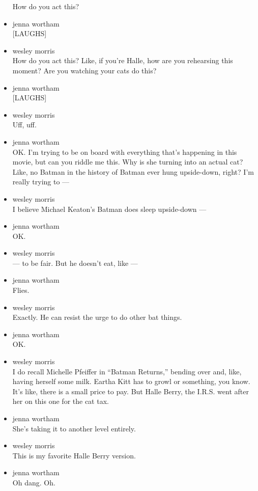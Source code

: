 \begin{itemize}
  How do you act this?
\item
  jenna wortham\\
  {[}LAUGHS{]}
\item
  wesley morris\\
  How do you act this? Like, if you're Halle, how are you rehearsing
  this moment? Are you watching your cats do this?
\item
  jenna wortham\\
  {[}LAUGHS{]}
\item
  wesley morris\\
  Uff, uff.
\item
  jenna wortham\\
  OK. I'm trying to be on board with everything that's happening in this
  movie, but can you riddle me this. Why is she turning into an actual
  cat? Like, no Batman in the history of Batman ever hung upside-down,
  right? I'm really trying to ---
\item
  wesley morris\\
  I believe Michael Keaton's Batman does sleep upside-down ---
\item
  jenna wortham\\
  OK.
\item
  wesley morris\\
  --- to be fair. But he doesn't eat, like ---
\item
  jenna wortham\\
  Flies.
\item
  wesley morris\\
  Exactly. He can resist the urge to do other bat things.
\item
  jenna wortham\\
  OK.
\item
  wesley morris\\
  I do recall Michelle Pfeiffer in ``Batman Returns,'' bending over and,
  like, having herself some milk. Eartha Kitt has to growl or something,
  you know. It's like, there is a small price to pay. But Halle Berry,
  the I.R.S. went after her on this one for the cat tax.
\item
  jenna wortham\\
  She's taking it to another level entirely.
\item
  wesley morris\\
  This is my favorite Halle Berry version.
\item
  jenna wortham\\
  Oh dang. Oh.


\end{itemize}

